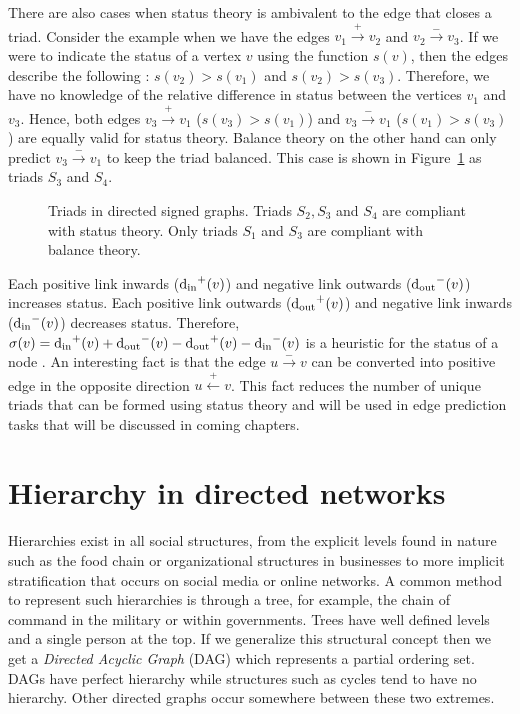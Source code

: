 There are also cases when status theory is ambivalent to the edge that closes a triad. Consider the example when we have the edges $v_1 \xrightarrow{+} v_2$ and $v_2 \xrightarrow{-} v_3$. If we were to indicate the status of a vertex $v$ using the function $s(v)$, then the edges describe the following : $s(v_2)>s(v_1) $ and $s(v_2)>s(v_3)$. Therefore, we have no knowledge of the relative difference in status between the vertices $v_1$ and $v_3$. Hence, both edges $v_3 \xrightarrow{+} v_1$ ($s(v_3) > s(v_1)$) and $v_3 \xrightarrow{-} v_1$ ($s(v_1) > s(v_3)$) are equally valid for status theory. Balance theory on the other hand can only predict $v_3 \xrightarrow{-} v_1$ to keep the triad balanced. This case is shown in Figure~\ref{fig:status-triads} as triads $S_3$ and $S_4$.

\begin{figure}[!ht] 
    \centering
    
    \caption{Triads in directed signed graphs. Triads $S_2,S_3$ and $S_4$ are compliant with status theory. Only triads $S_1$ and $S_3$ are compliant with balance theory.}
    \label{fig:status-triads}
\end{figure}

Each positive link inwards ($\operatorname*{d_{\text{in}}}^{+}(v)$) and negative link outwards ($\operatorname*{d_{\text{out}}}^{-}(v)$) increases status. Each positive link outwards ($\operatorname*{d_{\text{out}}}^{+}(v)$) and negative link inwards ($\operatorname*{d_{\text{in}}}^{-}(v)$) decreases status. Therefore, $\sigma(v) = \operatorname*{d_{\text{in}}}^{+}(v) + \operatorname*{d_{\text{out}}}^{-}(v) - \operatorname*{d_{\text{out}}}^{+}(v)- \operatorname*{d_{\text{in}}}^{-}(v)$ is a heuristic for the status of a node \cite{leskovec2010predicting}. An interesting fact is that the edge $u \xrightarrow{-} v$ can be converted into positive edge in the opposite direction $u \xleftarrow{+} v$. This fact reduces the number of unique triads that can be formed using status theory and will be used in edge prediction tasks that will be discussed in coming chapters.

\section{Hierarchy in directed networks}
\label{sec:hierarchy}
Hierarchies exist in all social structures, from the explicit levels found in nature such as the food chain or organizational structures in businesses to more implicit stratification that occurs on social media or online networks. A common method to represent such hierarchies is through a tree, for example, the chain of command in the military or within governments. Trees have well defined levels and a single person at the top. If we generalize this structural concept then we get a \textit{Directed Acyclic Graph} (DAG) which represents a partial ordering set. DAGs have perfect hierarchy while structures such as cycles tend to have no hierarchy. Other directed graphs occur somewhere between these two extremes.

